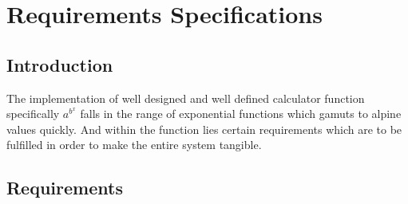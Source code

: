 \documentclass[a4paper, 11pt]{article}
\begin{document}
\newpage

\section{Requirements Specifications}

\subsection{Introduction}
The implementation of well designed and well defined calculator function specifically $a^{b^{x}}$  falls in the range of exponential functions which gamuts to alpine values quickly. And within the function lies certain requirements which are to be fulfilled in order to make the entire system tangible.

\subsection{Requirements} 
\end{document}
